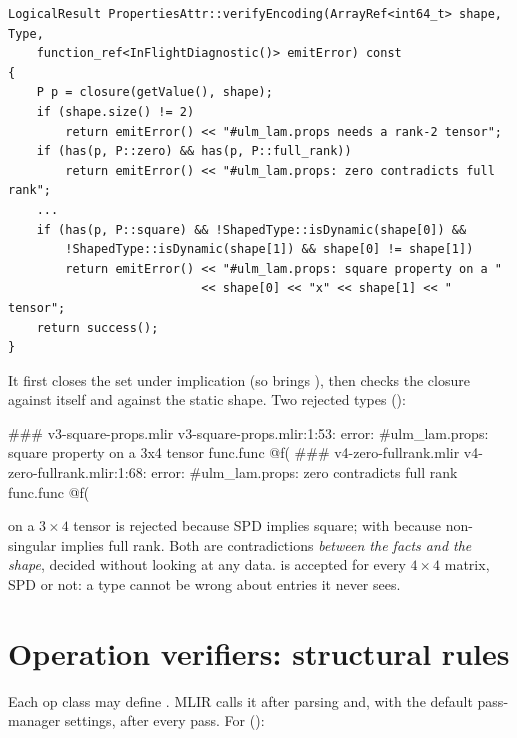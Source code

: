 \begin{lstlisting}[style=cpp]
LogicalResult PropertiesAttr::verifyEncoding(ArrayRef<int64_t> shape, Type,
    function_ref<InFlightDiagnostic()> emitError) const
{
    P p = closure(getValue(), shape);
    if (shape.size() != 2)
        return emitError() << "#ulm_lam.props needs a rank-2 tensor";
    if (has(p, P::zero) && has(p, P::full_rank))
        return emitError() << "#ulm_lam.props: zero contradicts full rank";
    ...
    if (has(p, P::square) && !ShapedType::isDynamic(shape[0]) &&
        !ShapedType::isDynamic(shape[1]) && shape[0] != shape[1])
        return emitError() << "#ulm_lam.props: square property on a "
                           << shape[0] << "x" << shape[1] << " tensor";
    return success();
}
\end{lstlisting}

It first closes the set under implication (so  brings
), then checks the closure against itself and against the
static shape. Two rejected types ():

\begin{textout}
### v3-square-props.mlir
v3-square-props.mlir:1:53: error: #ulm_lam.props: square property on a 3x4 tensor
func.func @f(%
### v4-zero-fullrank.mlir
v4-zero-fullrank.mlir:1:68: error: #ulm_lam.props: zero contradicts full rank
func.func @f(%
\end{textout}

 on a \(3\times 4\) tensor is rejected because SPD implies square;
 with  because non-singular implies full rank.
Both are contradictions \emph{between the facts and the shape}, decided
without looking at any data.  is
accepted for every \(4\times 4\) matrix, SPD or not: a type cannot be wrong
about entries it never sees.

\section{Operation verifiers: structural rules}
\label{sec:infra-verify}

Each op class may define . MLIR calls it after parsing and,
with the default pass-manager settings, after every pass. For
 ():

